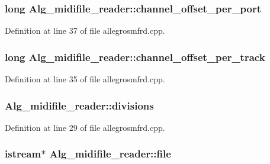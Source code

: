 \subsubsection[{\texorpdfstring{channel\+\_\+offset\+\_\+per\+\_\+port}{channel_offset_per_port}}]{\setlength{\rightskip}{0pt plus 5cm}long Alg\+\_\+midifile\+\_\+reader\+::channel\+\_\+offset\+\_\+per\+\_\+port}\hypertarget{class_alg__midifile__reader_a169548968bc5831736fa7417f25ec73f}{}\label{class_alg__midifile__reader_a169548968bc5831736fa7417f25ec73f}


Definition at line 37 of file allegrosmfrd.\+cpp.

\subsubsection[{\texorpdfstring{channel\+\_\+offset\+\_\+per\+\_\+track}{channel_offset_per_track}}]{\setlength{\rightskip}{0pt plus 5cm}long Alg\+\_\+midifile\+\_\+reader\+::channel\+\_\+offset\+\_\+per\+\_\+track}\hypertarget{class_alg__midifile__reader_a38df5c4ca804c06648900ea9a3b598da}{}\label{class_alg__midifile__reader_a38df5c4ca804c06648900ea9a3b598da}


Definition at line 35 of file allegrosmfrd.\+cpp.

\subsubsection[{\texorpdfstring{divisions}{divisions}}]{ Alg\+\_\+midifile\+\_\+reader\+::divisions}\hypertarget{class_alg__midifile__reader_a659a655b260791aa665ad3e5785e32c9}{}\label{class_alg__midifile__reader_a659a655b260791aa665ad3e5785e32c9}


Definition at line 29 of file allegrosmfrd.\+cpp.

\subsubsection[{\texorpdfstring{file}{file}}]{\setlength{\rightskip}{0pt plus 5cm}istream$\ast$ Alg\+\_\+midifile\+\_\+reader\+::file}\hypertarget{class_alg__midifile__reader_af1fd5dd8779e59babe39a3e97a01fb0c}{}\label{class_alg__midifile__reader_af1fd5dd8779e59babe39a3e97a01fb0c}


